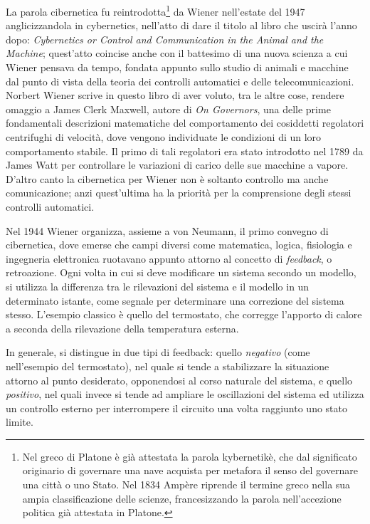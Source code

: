 La parola cibernetica fu reintrodotta\footnote{Nel greco di Platone è già attestata la parola kybernetikè, che dal significato originario di governare una nave acquista per metafora il senso del governare una città o uno Stato. Nel 1834 Ampère riprende il termine greco nella sua ampia classificazione delle scienze, francesizzando la parola nell'accezione politica già attestata in Platone.} da Wiener nell'estate del 1947 anglicizzandola in cybernetics, nell'atto di dare il titolo al libro che uscirà l'anno dopo: \emph{Cybernetics or Control and Communication in the Animal and the Machine}; quest'atto coincise anche con il battesimo di una nuova scienza a cui Wiener pensava da tempo, fondata appunto sullo studio di animali e macchine dal punto di vista della teoria dei controlli automatici e delle telecomunicazioni. Norbert Wiener scrive in questo libro di aver voluto, tra le altre cose, rendere omaggio a James Clerk Maxwell, autore di \emph{On Governors}, una delle prime fondamentali descrizioni matematiche del comportamento dei cosiddetti regolatori centrifughi di velocità, dove vengono individuate le condizioni di un loro comportamento stabile. Il primo di tali regolatori era stato introdotto nel 1789 da James Watt per controllare le variazioni di carico delle sue macchine a vapore. D'altro canto la cibernetica per Wiener non è soltanto controllo ma anche comunicazione; anzi quest'ultima ha la priorità per la comprensione degli stessi controlli automatici.

Nel 1944 Wiener organizza, assieme a von Neumann, il primo convegno di cibernetica, dove emerse che campi diversi come matematica, logica, fisiologia e ingegneria elettronica ruotavano appunto attorno al concetto di \emph{feedback}, o retroazione. Ogni volta in cui si deve modificare un sistema secondo un modello, si utilizza la differenza tra le rilevazioni del sistema e il modello in un determinato istante, come segnale per determinare una correzione del sistema stesso. L'esempio classico è quello del termostato, che corregge l'apporto di calore a seconda della rilevazione della temperatura esterna.

In generale, si distingue in due tipi di feedback: quello \emph{negativo} (come nell'esempio del termostato), nel quale si tende a stabilizzare la situazione attorno al punto desiderato, opponendosi al corso naturale del sistema, e quello \emph{positivo},  nel quali invece si tende ad ampliare le oscillazioni del sistema ed utilizza un controllo esterno per interrompere il circuito una volta raggiunto uno stato limite.

